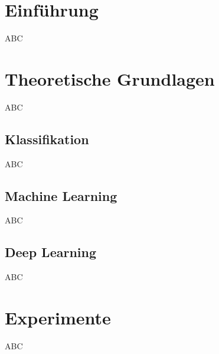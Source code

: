 \chapter{Einführung}
\label{einfuehrung}

ABC


\chapter{Theoretische Grundlagen}
\label{grundlagen}

ABC

\section{Klassifikation}
\label{korpora}

ABC


\section{Machine Learning}
\label{korpora}

ABC


\section{Deep Learning}
\label{korpora}

ABC


\chapter{Experimente}
\label{experimente}

ABC

